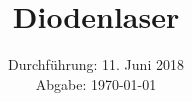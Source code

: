 

\subject{V60}
\title{Diodenlaser}
\date{%
  Durchführung: 11. Juni 2018
  \\
  Abgabe: \today
}



\maketitle
\thispagestyle{empty}
\tableofcontents
\newpage





% 

\printbibliography{}


